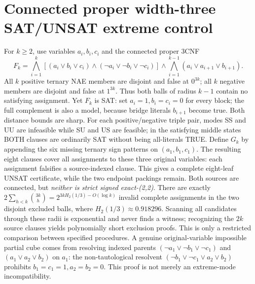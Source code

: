 \documentclass[10pt]{article}
\begin{document}
\section{Connected proper width-three SAT/UNSAT extreme control}
For $k\ge2$, use variables $a_i,b_i,c_i$ and the connected proper 3CNF
\[
F_k=\bigwedge_{i=1}^k[(a_i\vee b_i\vee c_i)\wedge(\neg a_i\vee\neg b_i\vee\neg c_i)]
\wedge\bigwedge_{i=1}^{k-1}(a_i\vee a_{i+1}\vee b_{i+1}).
\]
All $k$ positive ternary NAE members are disjoint and false at $0^{3k}$; all $k$ negative members are disjoint and false at $1^{3k}$. Thus both balls of radius $k-1$ contain no satisfying assignment. Yet $F_k$ is SAT: set $a_i=1,b_i=c_i=0$ for every block; the full complement is also a model, because bridge literals $b_{i+1}$ become true. Both distance bounds are sharp. For each positive/negative triple pair, modes SS and UU are infeasible while SU and US are feasible; in the satisfying middle states BOTH clauses are ordinarily SAT without being all-literals TRUE.
Define $G_k$ by appending the six missing ternary sign patterns on $(a_1,b_1,c_1)$. The resulting eight clauses cover all assignments to these three original variables: each assignment falsifies a source-indexed clause. This gives a complete eight-leaf UNSAT certificate, while the two endpoint packings remain. Both sources are connected, but \emph{neither is strict signed exact-(2,2)}.
There are exactly $2\sum_{h<k}\binom{3k}h=2^{3kH_2(1/3)-O(\log k)}$ invalid complete assignments in the two disjoint excluded balls, where $H_2(1/3)\approx0.918296$. Scanning all candidates through these radii is exponential and never finds a witness; recognizing the $2k$ source clauses yields polynomially short exclusion proofs. This is only a restricted comparison between specified procedures.
A genuine original-variable impossible partial cube comes from resolving indexed parents $(\neg a_1\vee\neg b_1\vee\neg c_1)$ and $(a_1\vee a_2\vee b_2)$ on $a_1$: the non-tautological resolvent $(\neg b_1\vee\neg c_1\vee a_2\vee b_2)$ prohibits $b_1=c_1=1,a_2=b_2=0$. This proof is not merely an extreme-mode incompatibility.
\end{document}
